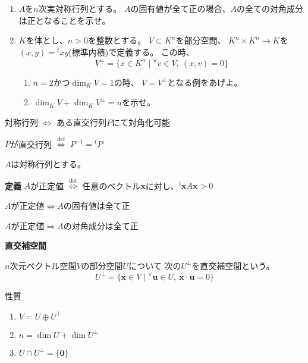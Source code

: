\documentclass[12pt,b5paper]{ltjsarticle}
\begin{document}
\begin{enumerate}
 \item
      $A$を$n$次実対称行列とする。
      $A$の固有値が全て正の場合、$A$の全ての対角成分は正となることを示せ。
 \item
      $K$を体とし、$n>0$を整数とする。
      $V\subset K^n$を部分空間、
      $K^n \times K^n \rightarrow K$を $(x,y)={}^{t}xy$(標準内積)で定義する。
      この時、
      \begin{equation}
       V^{\perp}=\{
        x\in K^n \mid {}^{\forall} v\in V ,\ (x,v)=0
        \}
      \end{equation}

      \begin{enumerate}
       \item
            $n=2$かつ$\dim_{K}V = 1$の時、
            $V=V^{\perp}$となる例をあげよ。
       \item
            $\dim_{K}V + \dim_{K}V^{\perp} =n$を示せ。
      \end{enumerate}
\end{enumerate}

\hrulefill


対称行列
$\Leftrightarrow$
ある直交行列$P$にて対角化可能

$P$が直交行列
$\stackrel{\mathrm{def}}{\Leftrightarrow}$
$P^{-1} = {}^{t}P$


$A$は対称行列とする。

\textbf{定義}\qquad
$A$が正定値
$\stackrel{\mathrm{def}}{\Leftrightarrow}$
任意のベクトル$\bm{x}$に対し、${}^{t}\bm{x}A\bm{x} >0$

$A$が正定値$\Leftrightarrow$$A$の固有値は全て正

$A$が正定値$\Rightarrow$$A$の対角成分は全て正

\dotfill

\textbf{直交補空間}

$n$次元ベクトル空間$V$の部分空間$U$について
次の$U^{\perp}$を直交補空間という。
\begin{equation}
 U^{\perp} =\{\bm{x}\in V \mid {}^{\forall}\bm{u}\in U ,\ \bm{x}\cdot\bm{u}=0 \}
\end{equation}

性質

\begin{enumerate}
 \item $V=U\oplus U^{\perp}$
 \item $n =\dim  U + \dim U^{\perp}$
 \item $U \cap U^{\perp} =\{\bm{0}\}$
\end{enumerate}
\end{document}
